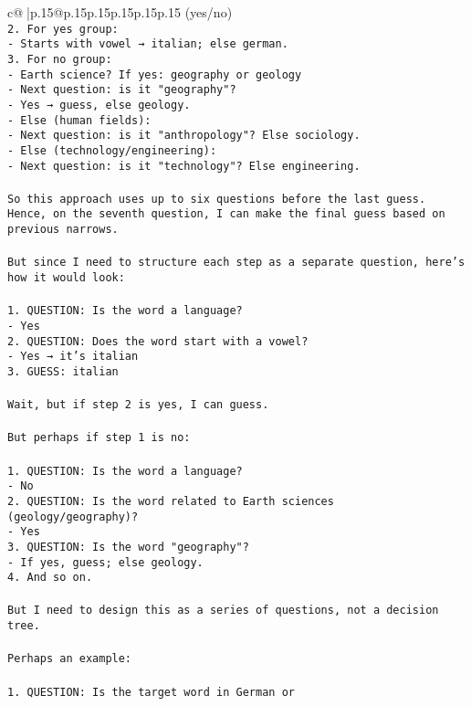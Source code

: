 \documentclass{article}
\begin{document}
{\begin{supertabular}{c@{$\;$}|p{.15\linewidth}@{}p{.15\linewidth}p{.15\linewidth}p{.15\linewidth}p{.15\linewidth}p{.15\linewidth}}
{{{(yes/no)\\ \tt 2. For yes group:\\ \tt    - Starts with vowel → italian; else german.\\ \tt 3. For no group:\\ \tt    - Earth science? If yes: geography or geology\\ \tt        - Next question: is it "geography"?\\ \tt           - Yes → guess, else geology.\\ \tt    - Else (human fields):\\ \tt        - Next question: is it "anthropology"? Else sociology.\\ \tt    - Else (technology/engineering):\\ \tt        - Next question: is it "technology"? Else engineering.\\ \tt \\ \tt So this approach uses up to six questions before the last guess. Hence, on the seventh question, I can make the final guess based on previous narrows.\\ \tt \\ \tt But since I need to structure each step as a separate question, here's how it would look:\\ \tt \\ \tt 1. QUESTION: Is the word a language?\\ \tt    - Yes\\ \tt 2. QUESTION: Does the word start with a vowel?\\ \tt    - Yes → it's italian\\ \tt 3. GUESS: italian\\ \tt \\ \tt Wait, but if step 2 is yes, I can guess.\\ \tt \\ \tt But perhaps if step 1 is no:\\ \tt \\ \tt 1. QUESTION: Is the word a language?\\ \tt    - No\\ \tt 2. QUESTION: Is the word related to Earth sciences (geology/geography)?\\ \tt    - Yes\\ \tt 3. QUESTION: Is the word "geography"?\\ \tt    - If yes, guess; else geology.\\ \tt 4. And so on.\\ \tt \\ \tt But I need to design this as a series of questions, not a decision tree.\\ \tt \\ \tt Perhaps an example:\\ \tt \\ \tt 1. QUESTION: Is the target word in German or }}}
\end{supertabular}}
\end{document}
